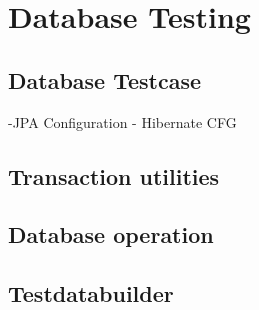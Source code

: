\chapter{Database Testing}

\section{Database Testcase}
-JPA Configuration
- Hibernate CFG

\section{Transaction utilities}

\section{Database operation}


\section{Testdatabuilder}